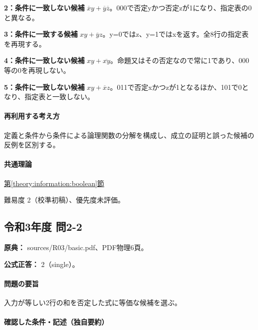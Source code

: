 \noindent\textbf{2：条件に一致しない候補} \(\overline x y+\overline y\overline z\)。000で否定yかつ否定zが1になり、指定表の0と異なる。\par

\noindent\textbf{3：条件に一致する候補} \(xy+\overline y z\)。y=\allowbreak{}0ではz、y=\allowbreak{}1ではxを返す。全8行の指定表を再現する。\par

\noindent\textbf{4：条件に一致しない候補} \(xy+\overline{xy}\)。命題又はその否定なので常に1であり、000等の0を再現しない。\par

\noindent\textbf{5：条件に一致しない候補} \(xy+\overline x z\)。011で否定xかつzが1となるほか、101で0となり、指定表と一致しない。\par

\paragraph{再利用する考え方} 定義と条件から条件による論理関数の分解を構成し、成立の証明と誤った候補の反例を区別する。

\paragraph{共通理論} \hyperref[theory:information:boolean]{第\ref*{theory:information:boolean}節}

\par 難易度 2（校準初稿）、優先度未評価。

\subsection{令和3年度 問2-2}
\label{q:r03-reg-basic-2-2}

\noindent\textbf{原典：} sources/R03/basic.pdf、PDF物理6頁。

\textbf{公式正答：} 2（single）。

\paragraph{問題の要旨} 入力が等しい2行の和を否定した式に等価な候補を選ぶ。

\paragraph{確認した条件・記述（独自要約）}\mbox{}\par

